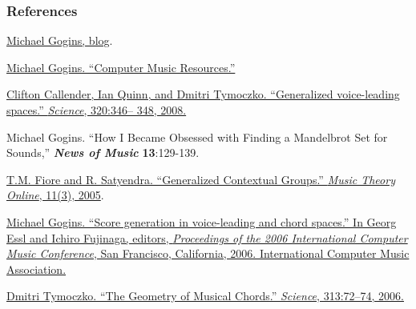\documentclass{beamer}
\begin{document}
\begin{frame}[allowframebreaks]
  \frametitle<presentation>{References}
    
  \begin{thebibliography}{10}
    
  \beamertemplatebookbibitems

   \href{http://michaelgogins.tumblr.com/}{Michael Gogins, blog}.
  
   \href{https://github.com/gogins/gogins.github.io}{Michael Gogins. ``Computer Music Resources.''}

   \href{http://www.sciencemag.org/content/320/5874/346.abstract}{Clifton Callender, Ian Quinn, and Dmitri Tymoczko. ``Generalized voice-leading spaces.'' \emph{Science}, 320:346–
348, 2008.}

   {Michael Gogins. ``How I Became Obsessed with Finding a Mandelbrot Set for Sounds,'' \textbf{\textit{News of Music}} \textbf{13}:129-139.}

   \href{http://www.mtosmt.org/issues/mto.05.11.3/mto.05.11.3.fiore_satyendra.pdf}{T.M. Fiore and R. Satyendra. ``Generalized Contextual
Groups.'' \emph{Music Theory Online}, 11(3), 2005}.

    \href{https://www.dropbox.com/s/ztej71n2fbn4tq4/Lindenmayer_Systems_Based_on_Riemannian_Transformations.pdf}{Michael Gogins. ``Score generation in voice-leading
and chord spaces.'' In Georg Essl and Ichiro Fujinaga,
editors, \emph{Proceedings of the 2006 International Computer Music Conference}, San Francisco, California,
2006. International Computer Music Association.}

   \href{http://www.sciencemag.org/content/313/5783/72.abstract?ijkey=wzKBea3ktKdu2&keytype=ref&siteid=sci}{Dmitri Tymoczko. ``The Geometry of Musical Chords.'' \emph{Science}, 313:72–74, 2006.}

  \end{thebibliography}

\end{frame}
\end{document}
